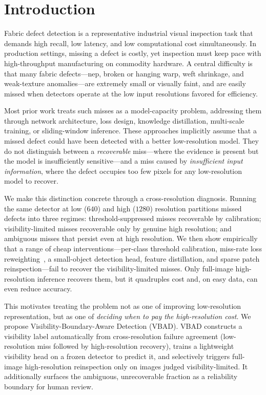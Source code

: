 \section{Introduction}
\label{sec:intro}

Fabric defect detection is a representative industrial visual inspection task
that demands high recall, low latency, and low computational cost
simultaneously. In production settings, missing a defect is costly, yet
inspection must keep pace with high-throughput manufacturing on commodity
hardware. A central difficulty is that many fabric defects---nep, broken or
hanging warp, weft shrinkage, and weak-texture anomalies---are extremely small
or visually faint, and are easily missed when detectors operate at the low
input resolutions favored for efficiency.

Most prior work treats such misses as a model-capacity problem, addressing them
through network architecture, loss design, knowledge distillation, multi-scale
training, or sliding-window inference. These approaches implicitly assume that a
missed defect could have been detected with a better low-resolution model. They
do not distinguish between a \emph{recoverable} miss---where the evidence is
present but the model is insufficiently sensitive---and a miss caused by
\emph{insufficient input information}, where the defect occupies too few pixels
for any low-resolution model to recover.

We make this distinction concrete through a cross-resolution diagnosis. Running
the same detector at low ($640$) and high ($1280$) resolution partitions missed
defects into three regimes: threshold-suppressed misses recoverable by
calibration; visibility-limited misses recoverable only by genuine high
resolution; and ambiguous misses that persist even at high resolution. We then
show empirically that a range of cheap interventions---per-class threshold
calibration, miss-rate loss reweighting~\cite{focalloss,eql}, a small-object detection head, feature
distillation, and sparse patch reinspection---fail to recover the
visibility-limited misses. Only full-image high-resolution inference recovers
them, but it quadruples cost and, on easy data, can even reduce accuracy.

This motivates treating the problem not as one of improving low-resolution
representation, but as one of \emph{deciding when to pay the high-resolution
cost}. We propose Visibility-Boundary-Aware Detection (VBAD). VBAD constructs a
visibility label automatically from cross-resolution failure agreement
(low-resolution miss followed by high-resolution recovery), trains a lightweight
visibility head on a frozen detector to predict it, and selectively triggers
full-image high-resolution reinspection only on images judged
visibility-limited. It additionally surfaces the ambiguous, unrecoverable
fraction as a reliability boundary for human review.


